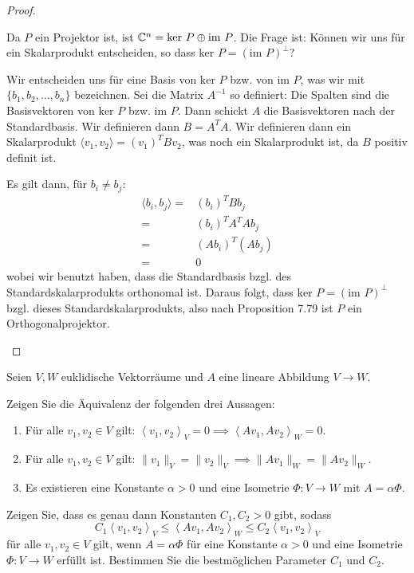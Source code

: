\begin{proof}
	\begin{parts}
	\item Da $P$ ein Projektor ist, ist $\mathbb{C}^n=\text{ker }P\oplus \text{im }P$. Die Frage ist: Können wir uns für ein Skalarprodukt entscheiden, so dass  $\text{ker }P=(\text{im }P)^\perp$? 
		
		Wir entscheiden uns für eine Basis von $\text{ker }P$ bzw. von $\text{im }P$, was wir mit $\{b_1,b_2,\dots, b_n\} $ bezeichnen. Sei die Matrix $A^{-1}$ so definiert: Die Spalten sind die Basisvektoren von $\text{ker }P$ bzw. $\text{im }P$. Dann schickt $A$ die Basisvektoren nach der Standardbasis. Wir definieren dann $B=A^TA$. Wir definieren dann ein Skalarprodukt $\langle v_1, v_2\rangle = (v_1)^TBv_2$, was noch ein Skalarprodukt ist, da $B$ positiv definit ist. 

		Es gilt dann, f\"{u}r $b_i\neq b_j$:
		\begin{align*}
			\langle b_i, b_j\rangle=& (b_i)^TBb_j\\
			=&(b_i)^TA^TAb_j\\
			=&(Ab_i)^T(Ab_j)\\
			=&0
		\end{align*}
		wobei wir benutzt haben, dass die Standardbasis bzgl. des Standardskalarprodukts orthonomal ist. Daraus folgt, dass $\text{ker }P=(\text{im }P)^\perp$ bzgl. dieses Standardskalarprodukts, also nach Proposition 7.79 ist $P$ ein Orthogonalprojektor.
	\end{parts}
\end{proof}
\begin{Problem}
	Seien $V,W$ euklidische Vektorräume und $A$ eine lineare Abbildung $V\to W$. 
	\begin{parts}
	\item Zeigen Sie die Äquivalenz der folgenden drei Aussagen:
		\begin{enumerate}[label=\roman*.]
			\item F\"{u}r alle $v_1,v_2\in V$ gilt: $\left<v_1,v_2 \right>_V=0\implies \left<Av_1, Av_2 \right>_W=0$.
			\item F\"{u}r alle $v_1,v_2\in V$ gilt: $\|v_1\|_V=\|v_2\|_V\implies \|Av_1\|_W=\|Av_2\|_W$.
			\item Es existieren eine Konstante $\alpha>0$ und eine Isometrie $\Phi:V\to W$ mit $A=\alpha\Phi$.
		\end{enumerate}
	\item Zeigen Sie, dass es genau dann Konstanten $C_1,C_2>0$ gibt, sodass
		\[
		C_1\left<v_1,v_2 \right>_V\le \left<Av_1,Av_2 \right>_W\le C_2\left<v_1,v_2 \right>_V
	\]
	f\"{u}r alle $v_1,v_2\in V$ gilt, wenn $A=\alpha\Phi$ f\"{u}r eine Konstante $\alpha>0$ und eine Isometrie $\Phi:V\to W$ erf\"{u}llt ist. Bestimmen Sie die bestmöglichen Parameter $C_1$ und $C_2$.
	\end{parts}
\end{Problem}

